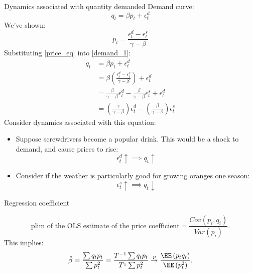 \documentclass[compress, 8pt]{beamer}
\begin{document}
\begin{frame}{Dynamics associated with quantity demanded}
Demand curve:
\begin{equation}\label{demand_1}
    q_t = \beta p_t + \epsilon_t^d
\end{equation}
We've shown:
\begin{equation}\label{price_eq}
    p_t = \frac{\epsilon_t^d - \epsilon_t^s}{\gamma - \beta}
\end{equation}
Substituting \eqref{price_eq} into \eqref{demand_1}:
\begin{align*}
    q_t &= \beta p_{t}+\epsilon_{t}^{d} \\
&= \beta\left(\frac{\epsilon_{t}^{d}-\epsilon_{t}^{s}}{\gamma-\beta}\right)+\epsilon_{t}^{d}\\
&= \frac{\beta}{\gamma - \beta} \epsilon_t^d - \frac{\beta}{\gamma - \beta} \epsilon_t^s + \epsilon_t^d  \\
&= \left(\frac{\gamma}{\gamma-\beta}\right)\epsilon_{t}^{d}-\left(\frac{\beta}{\gamma-\beta}\right)\epsilon_{t}^{s}
\end{align*}
Consider dynamics associated with this equation:
\begin{itemize}
    \item Suppose screwdrivers become a popular drink. This would be a shock to demand, and cause prices to rise:
    \begin{equation*}
        \epsilon_t^d \uparrow \implies q_t \uparrow
    \end{equation*}
    \item Consider if the weather is particularly good for growing oranges one season:
    \begin{equation*}
        \epsilon_t^s \uparrow \implies q_t \downarrow
    \end{equation*}

\end{itemize}



\end{frame}

\begin{frame}{Regression coefficient}

\begin{equation*}
\text{plim of the OLS estimate of the price coefficient}=\frac{Cov(p_{i},q_{i})}{Var(p_{i})}.
\end{equation*}
This implies:
\begin{equation*}
\hat{\beta}=\frac{\sum q_{t}p_{t}}{\sum p_{t}^{2}}=\frac{T^{-1}\sum q_{t}p_{t}}{T^{_{1}}\sum p_{t}^{2}}\overset{p}{\to}\frac{\EE\left(p_{t}q_{t}\right)}{\EE\left(p_{t}^{2}\right)}.
\end{equation*}


\end{frame}
\end{document}
